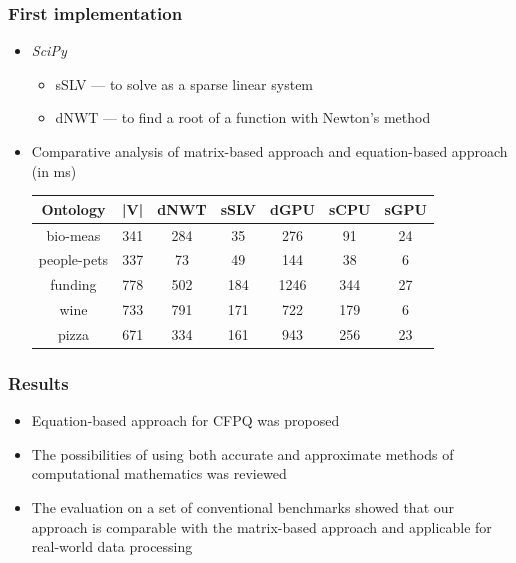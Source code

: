 \documentclass[aspectratio=169,xcolor=table]{beamer}
\begin{document}
\begin{frame}[fragile]
  \transwipe[direction=90]
  \frametitle{First implementation}

\begin{itemize}
    \item \textit{SciPy}
    \begin{itemize}
        \item sSLV --- to solve as a sparse linear system
        \item dNWT --- to find a root of a function with Newton's method
    \end{itemize}
    \item Comparative analysis of matrix-based approach and equation-based approach (in ms)

        \begin{table}[h]
        \centering
        \begin{tabular}{ | c | c || c | c || c | c | c |}
        \hline
        Ontology    & |V| & dNWT & sSLV & dGPU & sCPU &  sGPU \\
        \hline
        \hline
        bio-meas    & 341 &  284 & 35   & 276  & 91  & 24\\
        people-pets & 337 &  73  & 49   & 144  & 38  & 6\\
        funding     & 778 &  502 & 184  & 1246 & 344 & 27\\
        wine        & 733 &  791 & 171  & 722  & 179 & 6\\
        pizza       & 671 &  334 & 161  & 943  & 256 & 23\\
        \hline
        \end{tabular}
        
        \end{table}

\end{itemize}
\end{frame}



\begin{frame}[fragile]
  \transwipe[direction=90]
  \frametitle{Results}
  
\begin{itemize}

  \item Equation-based approach for CFPQ was proposed
  \item The possibilities of using both accurate and approximate methods of computational mathematics was reviewed
  \item The evaluation on a set of conventional benchmarks showed that our approach is comparable with the matrix-based approach and applicable for real-world data processing
  
\end{itemize}

\end{frame}
\end{document}
